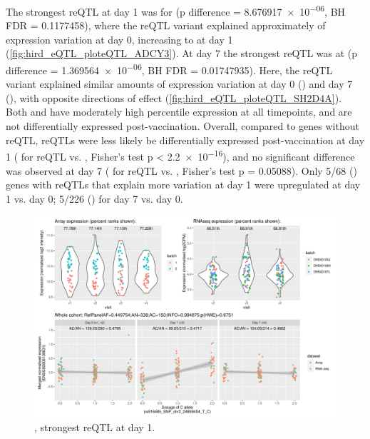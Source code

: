 The strongest reQTL at day 1 was for  (p difference = \num{8.676917e-06}, BH FDR = \num{0.1177458}),
where the \gls{reQTL} variant explained approximately  of expression variation at day 0, increasing to  at day 1 (\autoref{fig:hird_eQTL_ploteQTL_ADCY3}).
At day 7 the strongest \gls{reQTL} was at  (p difference = \num{1.369564e-06}, BH FDR = \num{0.01747935}).
Here, the \gls{reQTL} variant explained similar amounts of expression variation at day 0 () and day 7 (), with opposite directions of effect (\autoref{fig:hird_eQTL_ploteQTL_SH2D4A}).
Both  and  have moderately high percentile expression at all timepoints, and are not differentially expressed post-vaccination.
Overall, compared to genes without reQTL,
\glspl{reQTL} were less likely be differentially expressed post-vaccination at day 1 ( for reQTL vs. , Fisher's test p < \num{2.2e-16}),
and no significant difference was observed at day 7 ( for reQTL vs. , Fisher's test p = \num{0.05088}).
Only 5/68 () genes with \glspl{reQTL} that explain more variation at day 1 were upregulated at day 1 vs. day 0; 5/226 () for day 7 vs. day 0.

\begin{figure}
    \centering
    \includegraphics[width=1.0\textwidth,page=1]{mainmatter/figures/chapter_03/plot_dge_eqtl_genotypes.ENSG00000138031,rs916485_SNP_chr2_24859404_T_C.pdf}
    \caption{, strongest reQTL at day 1.}
    \label{fig:hird_eQTL_ploteQTL_ADCY3}
\end{figure}

